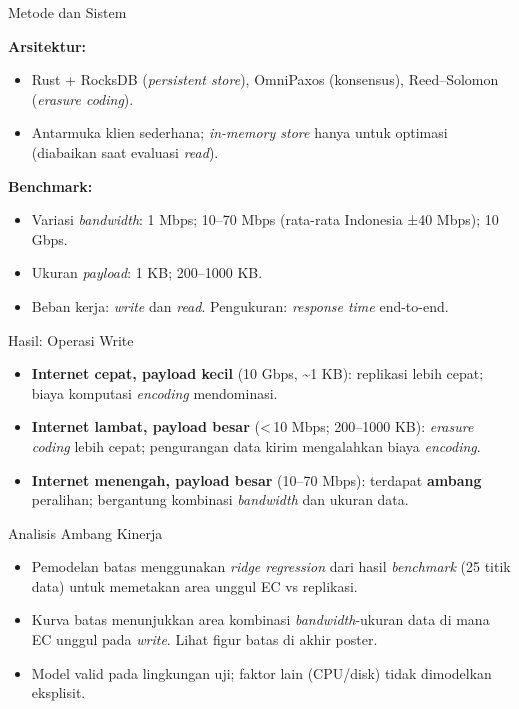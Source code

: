 \documentclass[a2,portrait]{config/poster/a0poster}
\newcommand{\postersection}[1]{%
	\begin{tcolorbox}[
		colback=ITBblue,
		colframe=ITBblue,
		fonttitle=\bfseries,
		coltext=white,
		sharp corners,
		boxrule=0pt,
		top=0pt,
		bottom=0pt,
		halign=center
	]
	\normalsize #1
	\end{tcolorbox}%
}
\begin{document}
\begin{multicols}{2}
\postersection{Metode dan Sistem}
			\textbf{Arsitektur:}
\begin{itemize}[leftmargin=*, itemsep=2pt]
	\item Rust + RocksDB (\textit{persistent store}), OmniPaxos (konsensus), Reed–Solomon (\textit{erasure coding}).
	\item Antarmuka klien sederhana; \textit{in-memory store} hanya untuk optimasi (diabaikan saat evaluasi \textit{read}).
\end{itemize}
			\textbf{Benchmark:}
\begin{itemize}[leftmargin=*, itemsep=2pt]
	\item Variasi \textit{bandwidth}: 1 Mbps; 10–70 Mbps (rata-rata Indonesia ±40 Mbps); 10 Gbps.
	\item Ukuran \textit{payload}: 1 KB; 200–1000 KB.
	\item Beban kerja: \textit{write} dan \textit{read}. Pengukuran: \textit{response time} end-to-end.
\end{itemize}


\postersection{Hasil: Operasi Write}
\begin{itemize}[leftmargin=*, itemsep=2pt]
	\item \textbf{Internet cepat, payload kecil} (10 Gbps, \textasciitilde1 KB): replikasi lebih cepat; biaya komputasi \textit{encoding} mendominasi.
	\item \textbf{Internet lambat, payload besar} (\textless{}\,10 Mbps; 200–1000 KB): \textit{erasure coding} lebih cepat; pengurangan data kirim mengalahkan biaya \textit{encoding}.
	\item \textbf{Internet menengah, payload besar} (10–70 Mbps): terdapat \textbf{ambang} peralihan; bergantung kombinasi \textit{bandwidth} dan ukuran data.
\end{itemize}


\postersection{Analisis Ambang Kinerja}
\begin{itemize}[leftmargin=*, itemsep=2pt]
	\item Pemodelan batas menggunakan \textit{ridge regression} dari hasil \textit{benchmark} (25 titik data) untuk memetakan area unggul EC vs replikasi.
	\item Kurva batas menunjukkan area kombinasi \textit{bandwidth}-ukuran data di mana EC unggul pada \textit{write}. Lihat figur batas di akhir poster.
	\item Model valid pada lingkungan uji; faktor lain (CPU/disk) tidak dimodelkan eksplisit.
\end{itemize}


\end{multicols}
\end{document}
